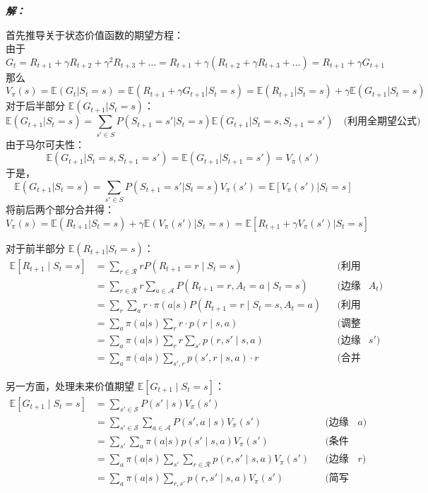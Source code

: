 \documentclass[12pt, a4paper]{article}
\newenvironment{solution}{
	\par\vspace{0.2cm}\noindent\textbf{\color{themecolor} \textit{解：}}
}{
	\par\vspace{0.5cm} %
}
\begin{document}
\begin{solution}
		首先推导关于状态价值函数的期望方程：\\	
		由于
		 \[ 
		G_t = R_{t+1} + \gamma R_{t+2} + \gamma^2 R_{t+3} + \dots = R_{t+1} + \gamma(R_{t+2} + \gamma R_{t+3} + \dots) = R_{t+1} + \gamma G_{t+1}
		 \]
		 那么
		\[ 
		V_{\pi}(s) = \mathbb{E}(G_t | S_t=s) 
		= \mathbb{E}(R_{t+1} + \gamma G_{t+1} | S_t=s) 
		= \mathbb{E}(R_{t+1} | S_t=s) + \gamma \mathbb{E}(G_{t+1} | S_t=s) 
		\]	
		对于后半部分 $\mathbb{E}(G_{t+1}|S_t=s)$：
		\[
		\mathbb{E}(G_{t+1}|S_t=s) = \sum_{s' \in S} P(S_{t+1}=s' | S_t=s) \mathbb{E}(G_{t+1} | S_t=s, S_{t+1}=s') \quad \text{(利用全期望公式)}
		\]
		由于马尔可夫性：
		\[ \mathbb{E}(G_{t+1} | S_t=s, S_{t+1}=s') = \mathbb{E}(G_{t+1} | S_{t+1}=s') = V_{\pi}(s') \]
		于是，
		\[ 
		\mathbb{E}(G_{t+1} | S_t=s) 
		= \sum_{s' \in S} P(S_{t+1}=s' | S_t=s) V_{\pi}(s') 
		= \mathbb{E}[V_{\pi}(s') | S_t=s] 
		\]
		将前后两个部分合并得：
		\[ 
		V_{\pi}(s) 
		= \mathbb{E}(R_{t+1}|S_t=s) + \gamma \mathbb{E}(V_{\pi}(s')|S_t=s) 
		= \mathbb{E}[R_{t+1} + \gamma V_{\pi}(s') | S_t=s] 
		\]
		
		对于前半部分 $\mathbb{E}(R_{t+1}|S_t=s)$：
		\begin{align*}
			\mathbb{E}[R_{t+1} \mid S_t=s] 
			&= \sum_{r \in \mathcal{R}} r P(R_{t+1}=r \mid S_t=s) && \text{(利用条件期望定义)} \\
			&= \sum_{r \in \mathcal{R}} r \sum_{a \in \mathcal{A}} P(R_{t+1}=r, A_t=a \mid S_t=s) && \text{(边缘化引入动作 $A_t$)} \\
			&= \sum_{r} \sum_{a} r \cdot \pi(a|s) P(R_{t+1}=r \mid S_t=s, A_t=a) && \text{(利用条件概率链式法则)} \\
			&= \sum_{a} \pi(a|s) \sum_{r} r \cdot p(r \mid s,a) && \text{(调整求和顺序)} \\
			&= \sum_{a} \pi(a|s) \sum_{r} r \sum_{s'} p(r, s' \mid s,a) && \text{(边缘化引入下一状态 $s'$)} \\
			&= \sum_{a} \pi(a|s) \sum_{s',r} p(s',r \mid s,a) \cdot r && \text{(合并求和项)}
		\end{align*}
		
		另一方面，处理未来价值期望 $\mathbb{E}[G_{t+1} \mid S_t=s]$：
		\begin{align*}
			\mathbb{E}[G_{t+1} \mid S_t=s] 
			&= \sum_{s' \in \mathcal{S}} P(s' \mid s) V_{\pi}(s') \\
			&= \sum_{s' \in \mathcal{S}} \sum_{a \in \mathcal{A}} P(s', a \mid s) V_{\pi}(s') && \text{(边缘化引入动作 $a$)} \\
			&= \sum_{s'} \sum_{a} \pi(a|s) p(s' \mid s,a) V_{\pi}(s') && \text{(条件概率展开)} \\
			&= \sum_{a} \pi(a|s) \sum_{s'} \sum_{r \in \mathcal{R}} p(r, s' \mid s,a) V_{\pi}(s') && \text{(边缘化引入奖励 $r$)} \\
			&= \sum_{a} \pi(a|s) \sum_{r, s'} p(r, s' \mid s,a) V_{\pi}(s') && \text{(简写与调整顺序)}
		\end{align*}
		

\end{solution}
\end{document}
